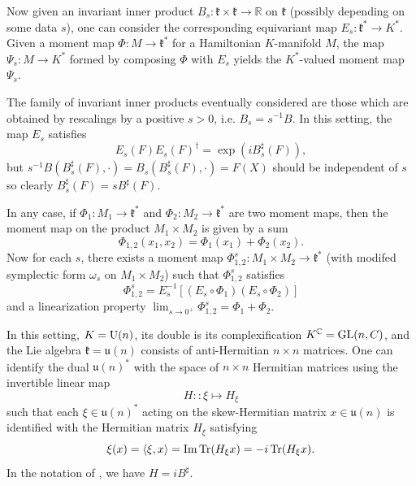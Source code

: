 \documentclass[notitlepage]{article}
\begin{document}
Now given an invariant inner product $B_s : \mathfrak k \times \mathfrak k \to \mathbb R$ on $\mathfrak k$ (possibly depending on some data $s$), one can consider the corresponding equivariant map $E_s : \mathfrak k^{*} \to K^{*}$. 
Given a moment map $\Phi : M \to \mathfrak k^{*}$ for a Hamiltonian $K$-manifold $M$, the map $\Psi_s : M \to K^{*}$ formed by composing $\Phi$ with $E_s$ yields the $K^{*}$-valued moment map $\Psi_s$.

The family of invariant inner products eventually considered are those which are obtained by rescalings by a positive $s > 0$, i.e. $B_s = s^{-1} B$.
In this setting, the map $E_s$ satisfies
\begin{equation}
    \label{eq:Es-map}
    E_s(F) E_s(F)^{\dagger} = \exp( i B_s^{\sharp}(F)),
\end{equation}
but $s^{-1}B(B_s^{\sharp}(F), \cdot) = B_s(B_s^{\sharp}(F), \cdot) = F(X)$ should be independent of $s$ so clearly $B_s^{\sharp}(F) = sB^{\sharp}(F)$.

In any case, if $\Phi_1 : M_1 \to \mathfrak k^{*}$ and $\Phi_2 : M_2 \to \mathfrak k^{*}$ are two moment maps, then the moment map on the product $M_1 \times M_2$ is given by a sum
\begin{equation}
    \Phi_{1,2} (x_1, x_2) = \Phi_1(x_1) + \Phi_2(x_2).
\end{equation}
Now for each $s$, there exists a moment map $\Phi^{s}_{1,2} : M_1 \times M_2 \to \mathfrak k^{*}$ (with modifed symplectic form $\omega_s$ on $M_1 \times M_2$) such that $\Phi^{s}_{1,2}$ satisfies
\begin{equation}
    \Phi^{s}_{1,2} = E_s^{-1}\left[(E_s \circ \Phi_1)(E_s \circ \Phi_2)\right]
\end{equation}
and a linearization property $\lim_{s\to 0^+}\Phi^{s}_{1,2} = \Phi_1 + \Phi_2$.

In this setting, $K = \operatorname{U}(n)$, its double is its complexification $K^{\mathbb C} = \operatorname{GL}(n,C)$, and the Lie algebra $\mathfrak k = \mathfrak u(n)$ consists of anti-Hermitian $n\times n$ matrices.
One can identify the dual $\mathfrak u(n)^{*}$ with the space of $n \times n$ Hermitian matrices using the invertible linear map
\begin{equation}
    H :: \xi \mapsto H_\xi
\end{equation}
such that each $\xi \in \mathfrak u(n)^{*}$ acting on the skew-Hermitian matrix $x \in \mathfrak u(n)$ is identified with the Hermitian matrix $H_\xi$ satisfying
\begin{equation}
    \xi(x) = \braket{\xi, x} = \mathrm{Im} \operatorname{Tr}( H_{\xi} x) = - i \operatorname{Tr}(H_{\xi}x).
\end{equation}
In the notation of \cite{alekseev2001linearization}, we have $H = i B^{\sharp}$.
\end{document}
